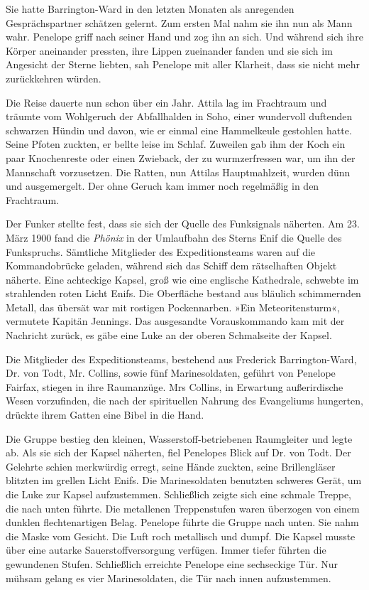 Sie hatte Barrington-Ward in den letzten Monaten als anregenden
Gesprächspartner schätzen gelernt. Zum ersten Mal nahm sie ihn nun
als Mann wahr. Penelope griff nach seiner Hand und zog ihn an sich.
Und während sich ihre Körper aneinander pressten, ihre Lippen
zueinander fanden und sie sich im Angesicht der Sterne liebten, sah
Penelope mit aller Klarheit, dass sie nicht mehr zurückkehren
würden.

\tb

Die Reise dauerte nun schon über ein Jahr. Attila lag im Frachtraum
und träumte vom Wohlgeruch der Abfallhalden in Soho, einer
wundervoll duftenden schwarzen Hündin und davon, wie er einmal eine
Hammelkeule gestohlen hatte. Seine Pfoten zuckten, er bellte leise
im Schlaf. Zuweilen gab ihm der Koch ein paar Knochenreste oder
einen Zwieback, der zu wurmzerfressen war, um ihn der Mannschaft
vorzusetzen. Die Ratten, nun Attilas Hauptmahlzeit, wurden dünn und
ausgemergelt. Der ohne Geruch kam immer noch regelmäßig in den
Frachtraum.

\tb

Der Funker stellte fest, dass sie sich der Quelle des Funksignals
näherten. Am 23. März 1900 fand die \textit{Phönix} in der Umlaufbahn des
Sterns Enif die Quelle des Funkspruchs. Sämtliche Mitglieder des
Expeditionsteams waren auf die Kommandobrücke geladen, während sich
das Schiff dem rätselhaften Objekt näherte. Eine achteckige Kapsel,
groß wie eine englische Kathedrale, schwebte im strahlenden roten
Licht Enifs. Die Oberfläche bestand aus bläulich schimmernden
Metall, das übersät war mit rostigen Pockennarben. »Ein
Meteoritensturm«, vermutete Kapitän Jennings. Das ausgesandte
Vorauskommando kam mit der Nachricht zurück, es gäbe eine Luke an
der oberen Schmalseite der Kapsel.

Die Mitglieder des Expeditionsteams, bestehend aus Frederick
Barrington-Ward, Dr. von Todt, Mr. Collins, sowie fünf
Marinesoldaten, geführt von Penelope Fairfax, stiegen in ihre
Raumanzüge. Mrs Collins, in Erwartung außerirdische Wesen
vorzufinden, die nach der spirituellen Nahrung des Evangeliums
hungerten, drückte ihrem Gatten eine Bibel in die Hand.

Die Gruppe bestieg den kleinen, Wasserstoff-betriebenen Raumgleiter
und legte ab. Als sie sich der Kapsel näherten, fiel Penelopes
Blick auf Dr. von Todt. Der Gelehrte schien merkwürdig erregt,
seine Hände zuckten, seine Brillengläser blitzten im grellen Licht
Enifs. Die Marinesoldaten benutzten schweres Gerät, um die Luke zur
Kapsel aufzustemmen. Schließlich zeigte sich eine schmale Treppe,
die nach unten führte. Die metallenen Treppenstufen waren überzogen
von einem dunklen flechtenartigen Belag. Penelope führte die Gruppe
nach unten. Sie nahm die Maske vom Gesicht. Die Luft roch
metallisch und dumpf. Die Kapsel musste über eine autarke
Sauerstoffversorgung verfügen. Immer tiefer führten die gewundenen
Stufen. Schließlich erreichte Penelope eine sechseckige Tür. Nur
mühsam gelang es vier Marinesoldaten, die Tür nach innen
aufzustemmen.

